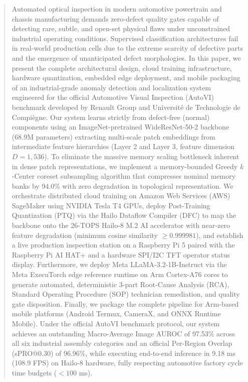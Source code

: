 \documentclass[journal,twocolumn]{IEEEtran}
\begin{document}
\begin{abstract}
Automated optical inspection in modern automotive powertrain and chassis manufacturing demands zero-defect quality gates capable of detecting rare, subtle, and open-set physical flaws under unconstrained industrial operating conditions. Supervised classification architectures fail in real-world production cells due to the extreme scarcity of defective parts and the emergence of unanticipated defect morphologies. In this paper, we present the complete architectural design, cloud training infrastructure, hardware quantization, embedded edge deployment, and mobile packaging of an industrial-grade anomaly detection and localization system engineered for the official Automotive Visual Inspection (AutoVI) benchmark developed by Renault Group and Université de Technologie de Compiègne. Our system learns strictly from defect-free (normal) components using an ImageNet-pretrained WideResNet-50-2 backbone (68.9M parameters) extracting multi-scale patch embeddings from intermediate feature hierarchies (Layer 2 and Layer 3, feature dimension $D = 1,536$). To eliminate the massive memory scaling bottleneck inherent in dense patch representations, we implement a memory-bounded Greedy $k$-Center coreset subsampling algorithm that compresses nominal memory banks by 94.0\% with zero degradation in topological representation. We orchestrate distributed cloud training on Amazon Web Services (AWS) SageMaker using NVIDIA Tesla T4 GPUs, deploy Post-Training Quantization (PTQ) via the Hailo Dataflow Compiler (DFC) to map the backbone onto the 26-TOPS Hailo-8 M.2 AI accelerator with near-zero feature degradation (minimum cosine similarity $\ge 0.999981$), and establish a live production inspection station on a Raspberry Pi 5 paired with the Raspberry Pi AI HAT+ and a hardware SPI/I2C TFT operator status display. Furthermore, we deploy Meta LLaMA-3.2-1B-Instruct via the Meta ExecuTorch edge reference runtime on Arm Cortex-A76 cores to generate automated, deterministic 3-part Root-Cause Analysis (RCA), Standard Operating Procedure (SOP) technician remediation, and quality gate disposition. Finally, we package the complete pipeline for Arm-based mobile platforms (Android Termux, CameraX, and ONNX Runtime Mobile). Under the official AutoVI benchmark protocol, our system achieves an outstanding Macro-Average Image AUROC of 97.53\% across all six industrial assembly categories and an official Per-Region Overlap (sPRO@0.30) of 96.96\%, while executing end-to-end inference in 9.18 ms (108.9 FPS) on Hailo-8 hardware, fully respecting automotive factory cycle time budgets ($<100$ ms).
\end{abstract}
\end{document}
